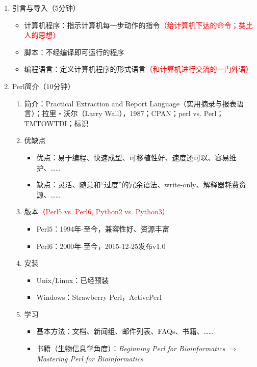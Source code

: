 \documentclass{TIJMUjiaoanLL}
\begin{document}
\begin{enumerate}
  \item 引言与导入（5分钟）
    \begin{itemize}
      \item 计算机程序：指示计算机每一步动作的指令\textcolor{red}{（给计算机下达的命令；类比人的思想）}
      \item 脚本：不经编译即可运行的程序
      \item 编程语言：定义计算机程序的形式语言\textcolor{red}{（和计算机进行交流的一门外语）}
    \end{itemize}
  \item Perl简介（10分钟）
    \begin{enumerate}
      \item 简介：Practical Extraction and Report Language（实用摘录与报表语言）；拉里・沃尔（Larry Wall），1987；CPAN；perl vs. Perl；TMTOWTDI；标识
      \item 优缺点
	\begin{itemize}
	  \item 优点：易于编程、快速成型、可移植性好、速度还可以、容易维护、……
	  \item 缺点：灵活、随意和“过度”的冗余语法、write-only、解释器耗费资源、……
	\end{itemize}
      \item 版本\textcolor{red}{（Perl5 vs. Perl6, Python2 vs. Python3）}
	\begin{itemize}
	  \item Perl5：1994年-至今，兼容性好、资源丰富
	  \item Perl6：2000年-至今，2015-12-25发布v1.0
	\end{itemize}
      \item 安装
	\begin{itemize}
	  \item Unix/Linux：已经预装
	  \item Windows：Strawberry Perl，ActivePerl
	\end{itemize}
      \item 学习
	\begin{itemize}
	  \item 基本方法：文档、新闻组、邮件列表、FAQs、书籍、……
	  \item 书籍（生物信息学角度）：\textit{Beginning Perl for Bioinformatics} $\Rightarrow$ \textit{Mastering Perl for Bioinformatics}

\end{itemize}
\end{enumerate}
\end{enumerate}
\end{document}
